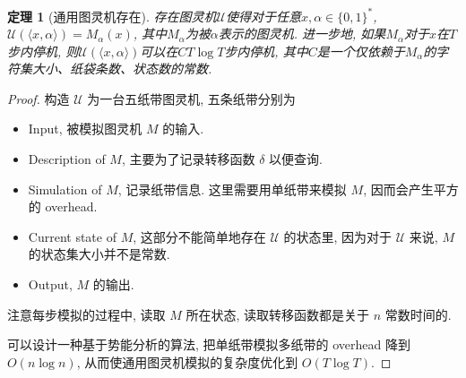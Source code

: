 \documentclass[8pt]{article}
\theoremstyle{compact}
\newtheorem{theorem}{定理}[section]
\begin{document}
\begin{theorem}[通用图灵机存在]
	存在图灵机$\mathcal U$使得对于任意$x, \alpha \in \{0, 1\}^*$, $\mathcal U(\langle x, \alpha \rangle ) = M_{\alpha}(x)$, 其中$M_{\alpha}$为被$\alpha$表示的图灵机. 进一步地, 如果$M_{\alpha}$对于$x$在$T$步内停机, 则$\mathcal U(\langle x, \alpha \rangle )$可以在$CT\log T$步内停机, 其中$C$是一个仅依赖于$M_{\alpha}$的字符集大小、纸袋条数、状态数的常数. 
\end{theorem}
\begin{proof}
	构造 $\mathcal U$ 为一台五纸带图灵机, 五条纸带分别为
	\begin{itemize}
		\item Input, 被模拟图灵机 $M$ 的输入.
		\item Description of $M$, 主要为了记录转移函数 $\delta$ 以便查询.
		\item Simulation of $M$, 记录纸带信息. 这里需要用单纸带来模拟 $M$, 因而会产生平方的 overhead.
		\item Current state of $M$, 这部分不能简单地存在 $\mathcal U$ 的状态里, 因为对于 $\mathcal U$ 来说, $M$ 的状态集大小并不是常数.
		\item Output, $M$ 的输出.
	\end{itemize}

	注意每步模拟的过程中, 读取 $M$ 所在状态, 读取转移函数都是关于 $n$ 常数时间的.

	可以设计一种基于势能分析的算法, 把单纸带模拟多纸带的 overhead 降到 $O(n \log n)$, 从而使通用图灵机模拟的复杂度优化到 $O(T \log T)$.
\end{proof}

\newpage
\end{document}
